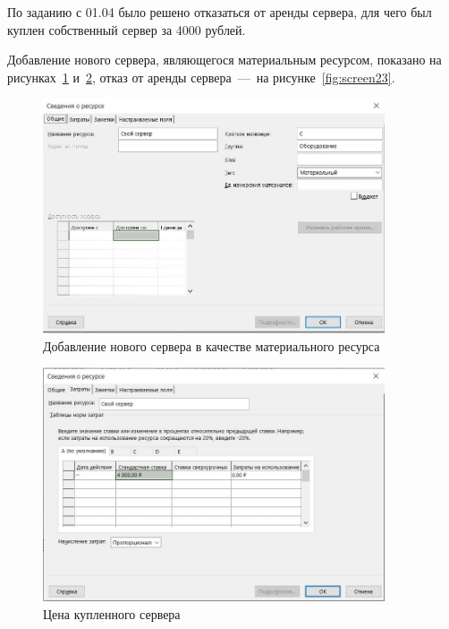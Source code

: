 По заданию с 01.04 было решено отказаться от аренды сервера, для чего был куплен собственный сервер за 4000 рублей.

Добавление нового сервера, являющегося материальным ресурсом, показано на рисунках~\ref{fig:screen21} и~\ref{fig:screen22}, отказ от аренды сервера~---~на рисунке~\ref{fig:screen23}.

\begin{figure}[H]
	\centering
	\includegraphics[width=0.9\textwidth]{img/lab4/screen21.jpg}
	\caption{Добавление нового сервера в качестве материального ресурса}
	\label{fig:screen21}
\end{figure}

\begin{figure}[H]
	\centering
	\includegraphics[width=0.9\textwidth]{img/lab4/screen22.jpg}
	\caption{Цена купленного сервера}
	\label{fig:screen22}
\end{figure}

